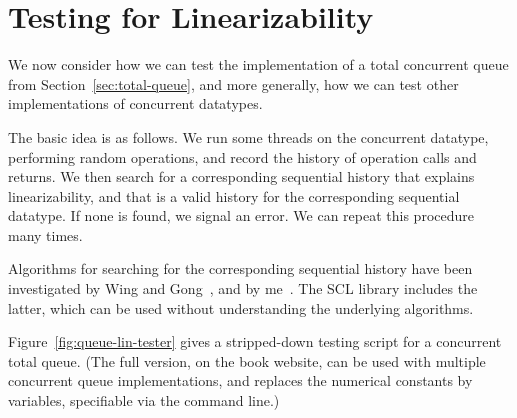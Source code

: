 \section{Testing for Linearizability}

We now consider how we can test the implementation of a total concurrent queue
from Section~\ref{sec:total-queue}, and more generally, how we can test other
implementations of concurrent datatypes.

The basic idea is as follows. We run some threads on the concurrent datatype,
performing random operations, and record the history of operation calls and
returns.  We then search for a corresponding sequential history that explains
linearizability, and that is a valid history for the corresponding sequential
datatype.  If none is found, we signal an error.  We can repeat this procedure
many times.

Algorithms for searching for the corresponding sequential history have been
investigated by Wing and Gong~\cite{wing-gong}, and by
me~\cite{gavin:lin-testing}.  The SCL library includes the latter, which can
be used without understanding the underlying algorithms. 

Figure~\ref{fig:queue-lin-tester} gives a stripped-down testing script for a
concurrent total queue.  (The full version, on the book website, can be used
with multiple concurrent queue implementations, and replaces the numerical
constants by variables, specifiable via the command line.)


